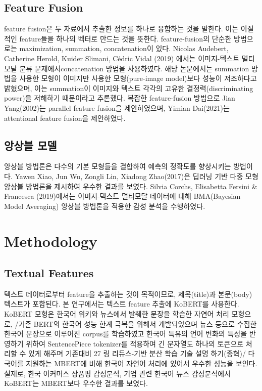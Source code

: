 \documentclass{article}
\begin{document}
\subsection{Feature Fusion}
feature fusion은 두 자료에서 추출한 정보를 하나로 융합하는 것을 말한다. 이는 이질적인 feature들을 하나의 벡터로 만드는 것을 뜻한다.
feature-fusion의 단순한 방법으로는 maximization, summation, concatenation이 있다.
Nicolas Audebert, Catherine Herold, Kuider Slimani, Cédric Vidal (2019) 에서는 이미지-텍스트 멀티모달 분류 문제에서concatenation 방법을 사용하였다\cite{audebert2020multimodal}.
해당 논문에서는 summation 방법을 사용한 모형이 이미지만 사용한 모형(pure-image model)보다 성능이 저조하다고 밝혔으며, 이는 summation이 이미지와 텍스트 각각의 고유한 결정력(discriminating power)을 저해하기 때문이라고 추론했다.
복잡한 feature-fusion 방법으로 Jian Yang(2002)는 parallel feature fusion\cite{yang2003feature}을 제안하였으며, Yimian Dai(2021)는 attentional feature fusion\cite{dai2021attentional}을 제안하였다.


\subsection{앙상블 모델}
앙상블 방법론은 다수의 기본 모형들을 결합하여 예측의 정확도를 향상시키는 방법이다.
Yawen Xiao, Jun Wu, Zongli Lin, Xiadong Zhao(2017)은 딥러닝 기반 다중 모형 앙상블 방법론을 제시하여 우수한 결과를 보였다\cite{xiao2018deep}.
Silvia Corchs, Elisabetta Fersini \& Francesca (2019)에서는 이미지-텍스트 멀티모달 데이터에 대해 BMA(Bayesian Model Averaging) 앙상블 방법론을 적용한 감성 분석을 수행하였다\cite{corchs2019ensemble}.


\section{Methodology}
\subsection{Textual Features}
텍스트 데이터로부터 feature을 추출하는 것이 목적이므로, 제목(title)과 본문(body) 텍스트가 포함된다.
본 연구에서는 텍스트 feature 추출에 KoBERT를 사용한다.
KoBERT 모형은 한국어 위키와 뉴스에서 발췌한 문장을 학습한 자연어 처리 모형으로,
 /기존 BERT\cite{devlin2018bert}의 한국어 성능 한계 극복을 위해서 개발되었으며 뉴스 등으로 수집한 한국어 문장으로 이루어진 corpus를 학습하였고 한국어 특유의 언어 변화의 특성을 반영하기 위하여 SentencePiece tokenizer를 적용하여 긴 문자열도 하나의 토큰으로 처리할 수 있게 해주며 기존대비 27%
링 리듀스-기반 분산 학습 기술 설명 하기(종혁)/
다국어를 지원하는 MBERT에 비해 한국어 자연어 처리에 있어서 우수한 성능을 보인다.
실제로, 한국 이커머스 상품평 감성분석, 기업 관련 한국어 뉴스 감성분석에서 KoBERT는 MBERT보다 우수한 결과를 보였다.
\end{document}
